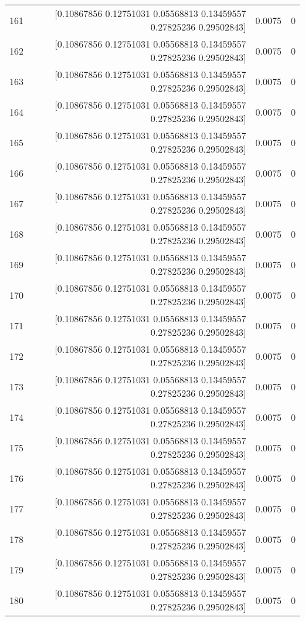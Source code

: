 \begin{longtable}{lrrr}
161 & [0.10867856 0.12751031 0.05568813 0.13459557 0.27825236 0.29502843] & 0.0075 & 0 \\
162 & [0.10867856 0.12751031 0.05568813 0.13459557 0.27825236 0.29502843] & 0.0075 & 0 \\
163 & [0.10867856 0.12751031 0.05568813 0.13459557 0.27825236 0.29502843] & 0.0075 & 0 \\
164 & [0.10867856 0.12751031 0.05568813 0.13459557 0.27825236 0.29502843] & 0.0075 & 0 \\
165 & [0.10867856 0.12751031 0.05568813 0.13459557 0.27825236 0.29502843] & 0.0075 & 0 \\
166 & [0.10867856 0.12751031 0.05568813 0.13459557 0.27825236 0.29502843] & 0.0075 & 0 \\
167 & [0.10867856 0.12751031 0.05568813 0.13459557 0.27825236 0.29502843] & 0.0075 & 0 \\
168 & [0.10867856 0.12751031 0.05568813 0.13459557 0.27825236 0.29502843] & 0.0075 & 0 \\
169 & [0.10867856 0.12751031 0.05568813 0.13459557 0.27825236 0.29502843] & 0.0075 & 0 \\
170 & [0.10867856 0.12751031 0.05568813 0.13459557 0.27825236 0.29502843] & 0.0075 & 0 \\
171 & [0.10867856 0.12751031 0.05568813 0.13459557 0.27825236 0.29502843] & 0.0075 & 0 \\
172 & [0.10867856 0.12751031 0.05568813 0.13459557 0.27825236 0.29502843] & 0.0075 & 0 \\
173 & [0.10867856 0.12751031 0.05568813 0.13459557 0.27825236 0.29502843] & 0.0075 & 0 \\
174 & [0.10867856 0.12751031 0.05568813 0.13459557 0.27825236 0.29502843] & 0.0075 & 0 \\
175 & [0.10867856 0.12751031 0.05568813 0.13459557 0.27825236 0.29502843] & 0.0075 & 0 \\
176 & [0.10867856 0.12751031 0.05568813 0.13459557 0.27825236 0.29502843] & 0.0075 & 0 \\
177 & [0.10867856 0.12751031 0.05568813 0.13459557 0.27825236 0.29502843] & 0.0075 & 0 \\
178 & [0.10867856 0.12751031 0.05568813 0.13459557 0.27825236 0.29502843] & 0.0075 & 0 \\
179 & [0.10867856 0.12751031 0.05568813 0.13459557 0.27825236 0.29502843] & 0.0075 & 0 \\
180 & [0.10867856 0.12751031 0.05568813 0.13459557 0.27825236 0.29502843] & 0.0075 & 0 \\

\end{longtable}
